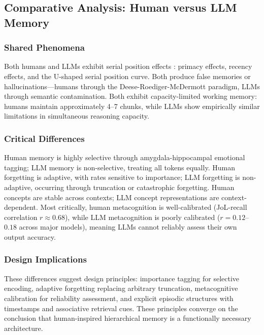 \documentclass[11pt,letterpaper]{article}
\begin{document}
\subsection{Comparative Analysis: Human versus LLM Memory}

\subsubsection{Shared Phenomena}

Both humans and LLMs exhibit serial position effects \cite{murdock1962serial, glanzer1966two}: primacy effects, recency effects, and the U-shaped serial position curve. Both produce false memories or hallucinations---humans through the Deese-Roediger-McDermott paradigm, LLMs through semantic contamination. Both exhibit capacity-limited working memory: humans maintain approximately 4--7 chunks, while LLMs show empirically similar limitations in simultaneous reasoning capacity.

\subsubsection{Critical Differences}

Human memory is highly selective through amygdala-hippocampal emotional tagging; LLM memory is non-selective, treating all tokens equally. Human forgetting is adaptive, with rates sensitive to importance; LLM forgetting is non-adaptive, occurring through truncation or catastrophic forgetting. Human concepts are stable across contexts; LLM concept representations are context-dependent. Most critically, human metacognition is well-calibrated (JoL-recall correlation $r \approx 0.68$), while LLM metacognition is poorly calibrated ($r = 0.12$--$0.18$ across major models), meaning LLMs cannot reliably assess their own output accuracy.

\subsubsection{Design Implications}

These differences suggest design principles: importance tagging for selective encoding, adaptive forgetting replacing arbitrary truncation, metacognitive calibration for reliability assessment, and explicit episodic structures with timestamps and associative retrieval cues. These principles converge on the conclusion that human-inspired hierarchical memory is a functionally necessary architecture.
\end{document}
